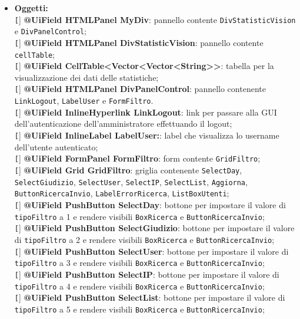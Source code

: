 {\begin{sloppypar}
{\begin{itemize}
\begin{itemize}
				
				\item[] \textbf{Oggetti:}\\
					\texttt[] \textbf{@UiField HTMLPanel MyDiv}: pannello contente \texttt{DivStatisticVision} e \texttt{DivPanelControl};\\
					\texttt[] \textbf{@UiField HTMLPanel DivStatisticVision}: pannello contente \texttt{cellTable};\\
					\texttt[] \textbf{@UiField CellTable<Vector<Vector<String>>}: tabella per la visualizzazione dei dati delle statistiche;\\
					\texttt[] \textbf{@UiField HTMLPanel DivPanelControl}: pannello contenente \texttt{LinkLogout}, \texttt{LabelUser} e \texttt{FormFiltro}.\\
					\texttt[] \textbf{@UiField InlineHyperlink LinkLogout}: link per passare alla GUI\g~ dell'autenticazione dell’amministratore effettuando il logout;\\
					\texttt[] \textbf{@UiField InlineLabel LabelUser:}: label che visualizza lo username dell'utente autenticato;\\
					\texttt[] \textbf{@UiField FormPanel FormFiltro}: form contente \texttt{GridFiltro};\\
					\texttt[] \textbf{@UiField Grid GridFiltro}: griglia contenente \texttt{SelectDay}, \texttt{SelectGiudizio}, \texttt{SelectUser}, \texttt{SelectIP}, \texttt{SelectList}, \texttt{Aggiorna}, \texttt{ButtonRicercaInvio}, \texttt{LabelErrorRicerca}, \texttt{ListBoxUtenti};\\
					\texttt[] \textbf{@UiField PushButton SelectDay}: bottone per impostare il valore di \texttt{tipoFiltro} a 1 e rendere visibili \texttt{BoxRicerca} e \texttt{ButtonRicercaInvio};\\
					\texttt[] \textbf{@UiField PushButton SelectGiudizio}: bottone per impostare il valore di \texttt{tipoFiltro} a 2 e rendere visibili \texttt{BoxRicerca} e \texttt{ButtonRicercaInvio};\\
					\texttt[] \textbf{@UiField PushButton SelectUser}: bottone per impostare il valore di \texttt{tipoFiltro} a 3 e rendere visibili \texttt{BoxRicerca} e \texttt{ButtonRicercaInvio};\\
					\texttt[] \textbf{@UiField PushButton SelectIP}: bottone per impostare il valore di \texttt{tipoFiltro} a 4 e rendere visibili \texttt{BoxRicerca} e \texttt{ButtonRicercaInvio};\\
					\texttt[] \textbf{@UiField PushButton SelectList}: bottone per impostare il valore di \texttt{tipoFiltro} a 5 e rendere visibili \texttt{BoxRicerca} e \texttt{ButtonRicercaInvio};\\

\end{itemize}
\end{itemize}}
\end{sloppypar}}
